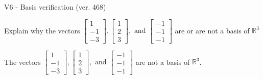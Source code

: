 \begin{exercise}
  \begin{exerciseTitle}V6 - Basis verification (ver. 468)\end{exerciseTitle}
  \begin{exerciseStatement}
    Explain why the vectors \(\left[\begin{array}{r}
1 \\
-1 \\
-3
\end{array}\right] , \left[\begin{array}{r}
1 \\
2 \\
3
\end{array}\right] , \text{ and } \left[\begin{array}{r}
-1 \\
-1 \\
-1
\end{array}\right]\) are or are not a basis of \(\mathbb{R}^3\)	


  \end{exerciseStatement}
  \begin{exerciseAnswer}
   The vectors \(\left[\begin{array}{r}
1 \\
-1 \\
-3
\end{array}\right] , \left[\begin{array}{r}
1 \\
2 \\
3
\end{array}\right] , \text{ and } \left[\begin{array}{r}
-1 \\
-1 \\
-1
\end{array}\right]\) 
  	 are not  a basis of \(\mathbb{R}^3\).
  


  \end{exerciseAnswer}
\end{exercise}